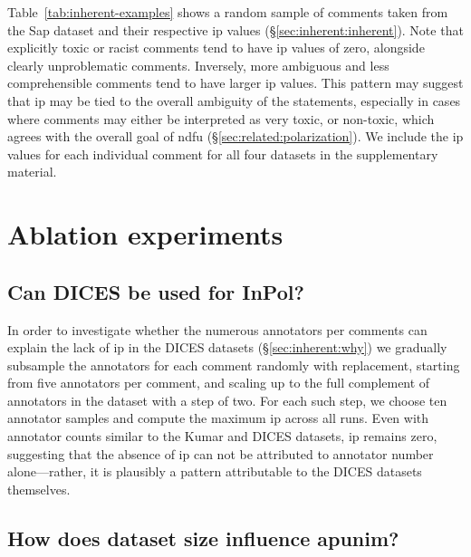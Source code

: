 \documentclass[11pt]{article}
\theoremstyle{definition}
\theoremstyle{plain}
\begin{document}
Table~\ref{tab:inherent-examples} shows a random sample of comments taken from the Sap dataset and their respective \ac{ip} values (\S\ref{sec:inherent:inherent}). Note that explicitly toxic or racist comments tend to have \ac{ip} values of zero, alongside clearly unproblematic comments. Inversely, more ambiguous and less comprehensible comments tend to have larger \ac{ip} values. This pattern may suggest that \ac{ip} may be tied to the overall ambiguity of the statements, especially in cases where comments may either be interpreted as very toxic, or non-toxic, which agrees with the overall goal of \ac{ndfu} (\S\ref{sec:related:polarization}).
We include the \ac{ip} values for each individual comment for all four datasets in the supplementary material.


\section{Ablation experiments}
\label{app:ablation}

\subsection{Can DICES be used for InPol?}
\label{app:ablation:dices}

In order to investigate whether the numerous annotators per comments can explain the lack of \ac{ip} in the DICES datasets (\S\ref{sec:inherent:why}) we gradually subsample the annotators for each comment randomly with replacement, starting from five annotators per comment, and scaling up to the full complement of annotators in the dataset with a step of two. For each such step, we choose ten annotator samples and compute the maximum \ac{ip} across all runs. Even with annotator counts similar to the Kumar and DICES datasets, \ac{ip} remains zero, suggesting that the absence of \ac{ip} can not be attributed to annotator number alone---rather, it is plausibly a pattern attributable to the DICES datasets themselves. 


\subsection{How does dataset size influence apunim?}
\label{app:ablation:sample-size}
\end{document}
